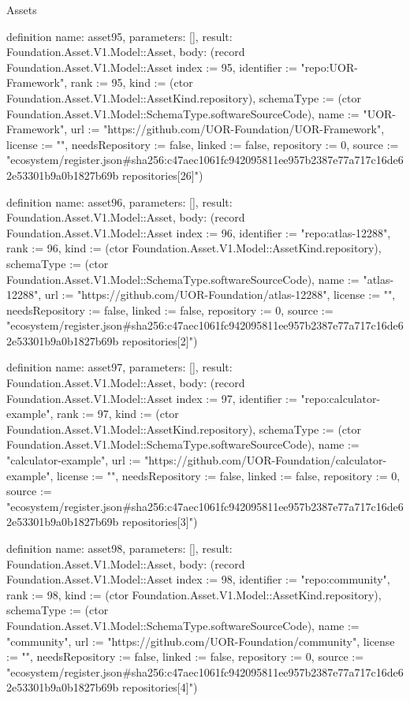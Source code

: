 \begin{lexlean}{Assets}
\begin{semanticmodule}
definition{
  name: asset95,
  parameters: [],
  result: Foundation.Asset.V1.Model::Asset,
  body: (record Foundation.Asset.V1.Model::Asset {index := 95, identifier := "repo:UOR-Framework", rank := 95, kind := (ctor Foundation.Asset.V1.Model::AssetKind.repository), schemaType := (ctor Foundation.Asset.V1.Model::SchemaType.softwareSourceCode), name := "UOR-Framework", url := "https://github.com/UOR-Foundation/UOR-Framework", license := "", needsRepository := false, linked := false, repository := 0, source := "ecosystem/register.json#sha256:c47aec1061fc942095811ee957b2387e77a717c16de62e53301b9a0b1827b69b repositories[26]"})
}

definition{
  name: asset96,
  parameters: [],
  result: Foundation.Asset.V1.Model::Asset,
  body: (record Foundation.Asset.V1.Model::Asset {index := 96, identifier := "repo:atlas-12288", rank := 96, kind := (ctor Foundation.Asset.V1.Model::AssetKind.repository), schemaType := (ctor Foundation.Asset.V1.Model::SchemaType.softwareSourceCode), name := "atlas-12288", url := "https://github.com/UOR-Foundation/atlas-12288", license := "", needsRepository := false, linked := false, repository := 0, source := "ecosystem/register.json#sha256:c47aec1061fc942095811ee957b2387e77a717c16de62e53301b9a0b1827b69b repositories[2]"})
}

definition{
  name: asset97,
  parameters: [],
  result: Foundation.Asset.V1.Model::Asset,
  body: (record Foundation.Asset.V1.Model::Asset {index := 97, identifier := "repo:calculator-example", rank := 97, kind := (ctor Foundation.Asset.V1.Model::AssetKind.repository), schemaType := (ctor Foundation.Asset.V1.Model::SchemaType.softwareSourceCode), name := "calculator-example", url := "https://github.com/UOR-Foundation/calculator-example", license := "", needsRepository := false, linked := false, repository := 0, source := "ecosystem/register.json#sha256:c47aec1061fc942095811ee957b2387e77a717c16de62e53301b9a0b1827b69b repositories[3]"})
}

definition{
  name: asset98,
  parameters: [],
  result: Foundation.Asset.V1.Model::Asset,
  body: (record Foundation.Asset.V1.Model::Asset {index := 98, identifier := "repo:community", rank := 98, kind := (ctor Foundation.Asset.V1.Model::AssetKind.repository), schemaType := (ctor Foundation.Asset.V1.Model::SchemaType.softwareSourceCode), name := "community", url := "https://github.com/UOR-Foundation/community", license := "", needsRepository := false, linked := false, repository := 0, source := "ecosystem/register.json#sha256:c47aec1061fc942095811ee957b2387e77a717c16de62e53301b9a0b1827b69b repositories[4]"})
}


\end{semanticmodule}
\end{lexlean}
